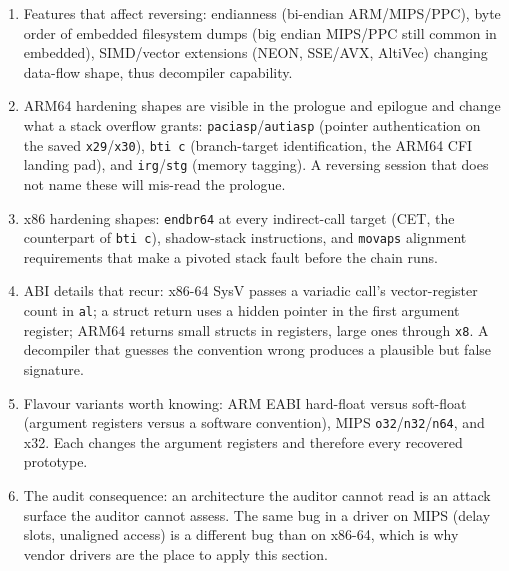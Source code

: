 \documentclass[12pt]{Training}
\begin{document}
\begin{enumerate}
\begin{enumerate}
\begin{enumerate}
            \item Knowledge of the convention where the target was compiled is a prerequisite to reading prologues, argument registers, and call sites.
        \end{enumerate}
        \item Features that affect reversing: endianness (bi-endian ARM/MIPS/PPC), byte order of embedded filesystem dumps (big endian MIPS/PPC still common in embedded), SIMD/vector extensions (NEON, SSE/AVX, AltiVec) changing data-flow shape, thus decompiler capability.
        \item ARM64 hardening shapes are visible in the prologue and epilogue and change what a stack overflow grants: \lstinline{paciasp}/\lstinline{autiasp} (pointer authentication on the saved \lstinline{x29}/\lstinline{x30}), \lstinline{bti c} (branch-target identification, the ARM64 CFI landing pad), and \lstinline{irg}/\lstinline{stg} (memory tagging). A reversing session that does not name these will mis-read the prologue.
        \item x86 hardening shapes: \lstinline{endbr64} at every indirect-call target (CET, the counterpart of \lstinline{bti c}), shadow-stack instructions, and \lstinline{movaps} alignment requirements that make a pivoted stack fault before the chain runs.
        \item ABI details that recur: x86-64 SysV passes a variadic call's vector-register count in \lstinline{al}; a struct return uses a hidden pointer in the first argument register; ARM64 returns small structs in registers, large ones through \lstinline{x8}. A decompiler that guesses the convention wrong produces a plausible but false signature.
        \item Flavour variants worth knowing: ARM EABI hard-float versus soft-float (argument registers versus a software convention), MIPS \lstinline{o32}/\lstinline{n32}/\lstinline{n64}, and x32. Each changes the argument registers and therefore every recovered prototype.
        \item The audit consequence: an architecture the auditor cannot read is an attack surface the auditor cannot assess. The same bug in a driver on MIPS (delay slots, unaligned access) is a different bug than on x86-64, which is why vendor drivers are the place to apply this section.
    \end{enumerate}
\end{enumerate}
\end{document}
